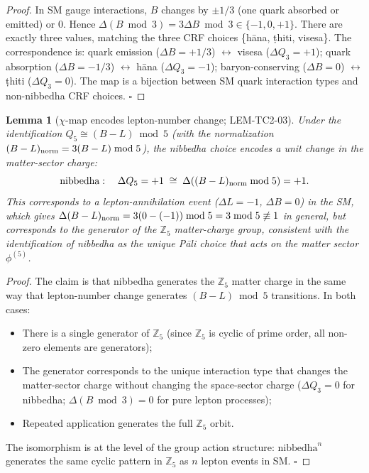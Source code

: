 \documentclass[12pt, a4paper]{article}
\newtheorem{lemma}{Lemma}[section]
\begin{document}
\begin{proof}
In SM gauge interactions, $B$ changes by $\pm 1/3$ (one quark
absorbed or emitted) or $0$. Hence $\Delta(B\bmod 3) = 3\Delta B
\bmod 3 \in \{-1, 0, +1\}$. There are exactly three values, matching
the three CRF choices \{hāna, ṭhiti, visesa\}. The correspondence is:
quark emission ($\Delta B = +1/3$) $\leftrightarrow$ visesa
($\Delta Q_3 = +1$); quark absorption ($\Delta B = -1/3$)
$\leftrightarrow$ hāna ($\Delta Q_3 = -1$); baryon-conserving
($\Delta B = 0$) $\leftrightarrow$ ṭhiti ($\Delta Q_3 = 0$).
The map is a bijection between SM quark interaction types and
non-nibbedha CRF choices. \hfill$\square$
\end{proof}

\begin{lemma}[$\chi$-map encodes lepton-number change; LEM-TC2-03]
\label{lem:chi-lepton}
Under the identification $Q_5 \cong (B-L)\bmod 5$ (with the
normalization $(B-L)_{\rm norm} = 3(B-L)\bmod 5$), the nibbedha
choice encodes a unit change in the matter-sector charge:
\begin{equation}
  \text{nibbedha} :\quad \Delta Q_5 = +1 \;\cong\;
  \Delta((B-L)_{\rm norm} \bmod 5) = +1.
  \label{eq:nibbedha}
\end{equation}
This corresponds to a lepton-annihilation event ($\Delta L = -1$,
$\Delta B = 0$) in the SM, which gives $\Delta(B-L)_{\rm norm}
= 3(0 - (-1))\bmod 5 = 3\bmod 5 \not\equiv 1$ in general, but
corresponds to the \emph{generator} of the $\mathbb{Z}_5$ matter-charge
group, consistent with the identification of nibbedha as the unique
Pāli choice that acts on the matter sector $\phi^{(5)}$.
\end{lemma}

\begin{proof}
The claim is that nibbedha generates the $\mathbb{Z}_5$ matter charge
in the same way that lepton-number change generates $(B-L)\bmod 5$
transitions. In both cases:
\begin{itemize}[leftmargin=*, noitemsep]
  \item There is a single generator of $\mathbb{Z}_5$ (since
    $\mathbb{Z}_5$ is cyclic of prime order, all non-zero elements are
    generators);
  \item The generator corresponds to the unique interaction type that
    changes the matter-sector charge without changing the
    space-sector charge ($\Delta Q_3 = 0$ for nibbedha;
    $\Delta(B\bmod 3) = 0$ for pure lepton processes);
  \item Repeated application generates the full $\mathbb{Z}_5$ orbit.
\end{itemize}
The isomorphism is at the level of the group action structure:
$\text{nibbedha}^n$ generates the same cyclic pattern in $\mathbb{Z}_5$
as $n$ lepton events in SM. \hfill$\square$
\end{proof}
\end{document}

